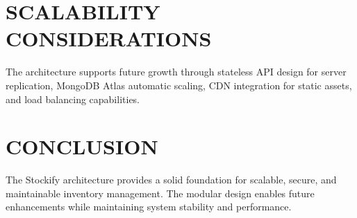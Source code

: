 \section{SCALABILITY CONSIDERATIONS}

The architecture supports future growth through stateless API design for server replication, MongoDB Atlas automatic scaling, CDN integration for static assets, and load balancing capabilities.

\section{CONCLUSION}

The Stockify architecture provides a solid foundation for scalable, secure, and maintainable inventory management. The modular design enables future enhancements while maintaining system stability and performance.